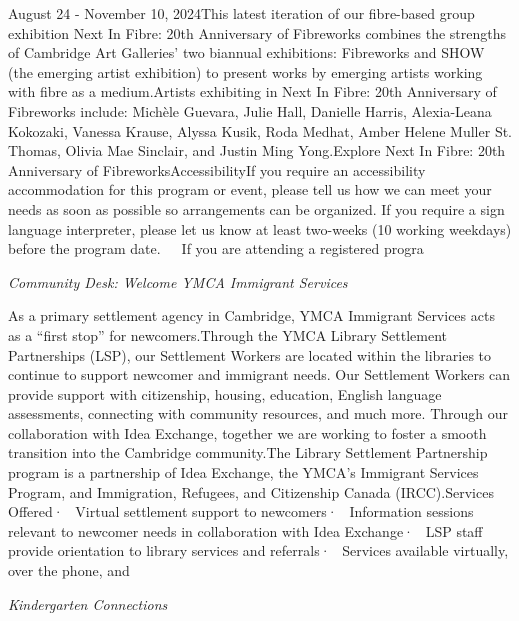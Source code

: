 \documentclass[letterpaper, 10pt]{article}
\newcommand{\subtitle}[1]{\textit{\large #1}\vspace{0.5em}}
\newcommand{\articlecontent}[1]{\small #1\vspace{1em}}
\begin{document}
\begin{multicols}{2}
{August 24 - November 10, 2024This latest iteration of our fibre-based group exhibition Next In Fibre: 20th Anniversary of Fibreworks combines the strengths of Cambridge Art Galleries’ two biannual exhibitions: Fibreworks and SHOW (the emerging artist exhibition) to present works by emerging artists working with fibre as a medium.Artists exhibiting in Next In Fibre: 20th Anniversary of Fibreworks include: Michèle Guevara, Julie Hall, Danielle Harris, Alexia-Leana Kokozaki, Vanessa Krause, Alyssa Kusik, Roda Medhat, Amber Helene Muller St. Thomas, Olivia Mae Sinclair, and Justin Ming Yong.Explore Next In Fibre: 20th Anniversary of FibreworksAccessibilityIf you require an accessibility accommodation for this program or event, please tell us how we can meet your needs as soon as possible so arrangements can be organized. If you require a sign language interpreter, please let us know at least two-weeks (10 working weekdays) before the program date.   If you are attending a registered progra
}
\vspace{10px}

\subtitle{Community Desk: Welcome YMCA Immigrant Services}

\articlecontent{

\qrcode[height=1.5cm]{https://ideaexchange.libnet.info/event/11502100}
\vspace{10px}

As a primary settlement agency in Cambridge, YMCA Immigrant Services acts as a “first stop” for newcomers.Through the YMCA Library Settlement Partnerships (LSP), our Settlement Workers are located within the libraries to continue to support newcomer and immigrant needs. Our Settlement Workers can provide support with citizenship, housing, education, English language assessments, connecting with community resources, and much more. Through our collaboration with Idea Exchange, together we are working to foster a smooth transition into the Cambridge community.The Library Settlement Partnership program is a partnership of Idea Exchange, the YMCA’s Immigrant Services Program, and Immigration, Refugees, and Citizenship Canada (IRCC).Services Offered·  Virtual settlement support to newcomers·  Information sessions relevant to newcomer needs in collaboration with Idea Exchange·  LSP staff provide orientation to library services and referrals·  Services available virtually, over the phone, and 
}
\vspace{10px}

\subtitle{Kindergarten Connections}

\articlecontent{

}
\end{multicols}
\end{document}
